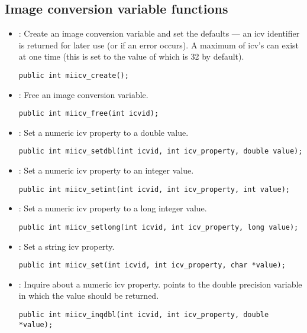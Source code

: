 \documentclass{article}
\begin{document}
\subsection{Image conversion variable functions}

\begin{itemize}

\item {} : Create an image conversion variable and
set the defaults --- an icv identifier is returned for later use (or
 if an error occurs). A maximum of
 icv's can exist at one time (this is set to 
the value of  which is 32 by default).
\begin{verbatim}
public int miicv_create();
\end{verbatim}

\item {} : Free an image conversion variable.
\begin{verbatim}
public int miicv_free(int icvid);
\end{verbatim}

\item {} : Set a numeric icv property to a double value.
\begin{verbatim}
public int miicv_setdbl(int icvid, int icv_property, double value);
\end{verbatim}

\item {} : Set a numeric icv property to an integer value.
\begin{verbatim}
public int miicv_setint(int icvid, int icv_property, int value);
\end{verbatim}

\item {} : Set a numeric icv property to a long
integer value.
\begin{verbatim}
public int miicv_setlong(int icvid, int icv_property, long value);
\end{verbatim}

\item {} : Set a string icv property.
\begin{verbatim}
public int miicv_set(int icvid, int icv_property, char *value);
\end{verbatim}

\item {} : Inquire about a numeric icv property.
 points to the double precision variable in which the
value should be returned. 
\begin{verbatim}
public int miicv_inqdbl(int icvid, int icv_property, double *value);
\end{verbatim}


\end{itemize}
\end{document}
